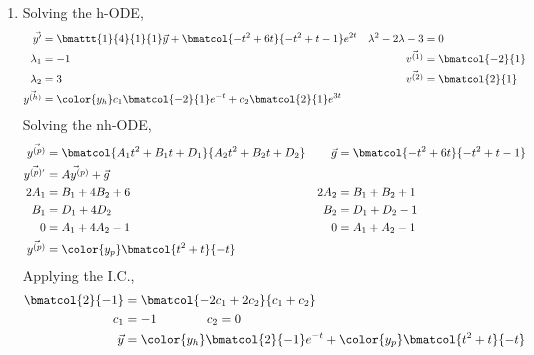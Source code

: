 \begin{enumerate}
    \item Solving the h-ODE,
          \begin{align}
              \vec{y'}                            & = \bmattt{1}{4}{1}{1} \vec{y}
              + \bmatcol{-t^2+6t}{-t^2+t-1}e^{2t} &
              \lambda^{2} - 2\lambda - 3          & = 0                             \\
              \lambda_1                           & = -1                          &
              \vec{v^{(1)}}                       & = \bmatcol{-2}{1}               \\
              \lambda_2                           & = 3                           &
              \vec{v^{(2)}}                       & = \bmatcol{2}{1}                \\
              \vec{y^{(h)}}                       & = \color{y_h}
              c_1 \bmatcol{-2}{1}e^{-t} + c_2 \bmatcol{2}{1} e^{3t}
          \end{align}
          Solving the nh-ODE,
          \begin{align}
              \vec{y^{(p)}}           & = \bmatcol{A_1 t^2 + B_1 t + D_1}
              {A_2 t^2 + B_2 t + D_2} &
              \vec{g}                 & = \bmatcol{-t^2 + 6t}{-t^2 + t - 1}   \\
              \vec{y^{(p)'}}          & = \vec{Ay^{(p)}} + \vec{g}            \\
              2A_1                    & = B_1 + 4B_2 + 6                    &
              2A_2                    & = B_1 + B_2 + 1                       \\
              B_1                     & = D_1 + 4D_2                        &
              B_2                     & = D_1 + D_2 - 1                       \\
              0                       & = A_1 + 4A_2 - 1                    &
              0                       & = A_1 + A_2 - 1                       \\
              \vec{y^{(p)}}           & = \color{y_p} \bmatcol{t^2 + t}{-t}
          \end{align}
          Applying the I.C.,
          \begin{align}
              \bmatcol{2}{-1} & = \bmatcol{-2c_1 + 2c_2}
              {c_1 + c_2}                                             \\
              c_1             & = -1 \qquad\qquad c_2 = 0             \\
              \vec{y}         & = {\color{y_h} \bmatcol{2}{-1}e^{-t}}
              + {\color{y_p} \bmatcol{t^2 + t}{-t}}
          \end{align}


\end{enumerate}
